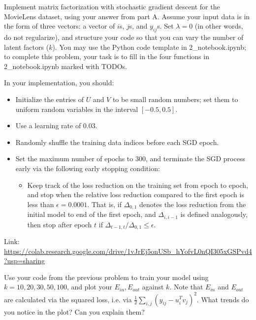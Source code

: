 Implement matrix factorization with stochastic gradient descent for the MovieLens dataset, using your answer from part A. Assume your input data is in the form of three vectors: a vector of $i$s, $j$s, and $y_{ij}$s. Set $\lambda = 0$ (in other words, do not regularize), and structure your code so that you can vary the number of latent factors ($k$). You may use the Python code template in 2_notebook.ipynb; to complete this problem, your task is to fill in the four functions in 2_notebook.ipynb marked with TODOs.

In your implementation, you should:

\begin{itemize}
\item Initialize the entries of $U$ and $V$ to be small random numbers; set them to uniform random variables in the interval $[-0.5, 0.5]$.
\item Use a learning rate of 0.03.
\item Randomly shuffle the training data indices before each SGD epoch.
\item Set the maximum number of epochs to 300, and terminate the SGD process early via the following early stopping condition:
\begin{itemize}
\item Keep track of the loss reduction on the training set from epoch to epoch, and stop when the relative loss reduction compared to the first epoch is less than $\epsilon = 0.0001$.  That is, if $\Delta_{0,1}$ denotes the loss reduction from the initial model to end of the first epoch, and $\Delta_{i, i-1}$ is defined analogously, then stop after epoch $t$ if $\Delta_{t-1,t} / \Delta_{0,1} \leq \epsilon$.
\end{itemize}
\end{itemize}

\begin{solution}
 Link: \url{https://colab.research.google.com/drive/1vJrEj5onUSb_hYofvL0nQI305xGSPvd4?usp=sharing}

\end{solution}

\problem[5]
Use your code from the previous problem to train your model using $k=10, 20, 30, 50, 100$, and plot your $E_{in}, E_{out}$ against $k$. Note that $E_{in}$ and $E_{out}$ are calculated via the squared loss, i.e. via $\frac{1}{2}\sum_{i,j} \left( y_{ij} - u_i^Tv_j\right)^2$. What trends do you notice in the plot? Can you explain them?

